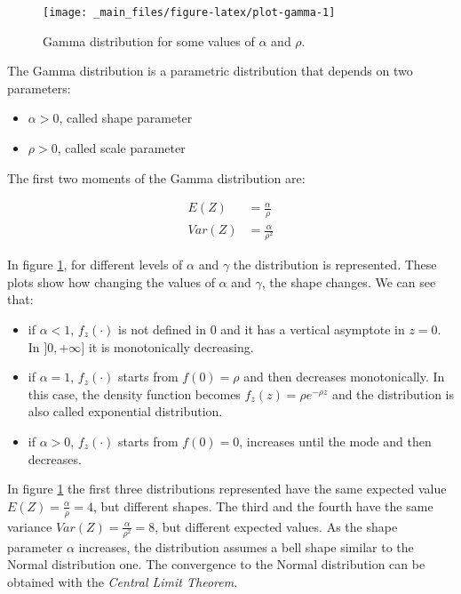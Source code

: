 \documentclass[a4paper, nobind]{templates/ociamthesis}
\providecommand{\tightlist}{%
  \setlength{\itemsep}{0pt}\setlength{\parskip}{0pt}}
\theoremstyle{definition}
\theoremstyle{definition}
\theoremstyle{definition}
\theoremstyle{remark}
\begin{document}
\begin{figure}[hbtp]

{\centering \texttt{[image: \_main\_files/figure-latex/plot-gamma-1]} 

}

\caption{Gamma distribution for some values of $\alpha$ and $\rho$.}\label{fig:plot-gamma}
\end{figure}

The Gamma distribution is a parametric distribution that depends on two parameters:

\begin{itemize}
\tightlist
\item
  \(\alpha > 0\), called shape parameter
\item
  \(\rho > 0\), called scale parameter
\end{itemize}

The first two moments of the Gamma distribution are:

\begin{align*}
E(Z)   & = \frac{\alpha}{\rho} \\
Var(Z) & = \frac{\alpha}{\rho^2}
\end{align*}

In figure \ref{fig:plot-gamma}, for different levels of \(\alpha\) and \(\gamma\) the distribution is represented. These plots show how changing the values of \(\alpha\) and \(\gamma\), the shape changes. We can see that:

\begin{itemize}
\tightlist
\item
  if \(\alpha < 1\), \(f_z(\cdot)\) is not defined in \(0\) and it has a vertical asymptote in \(z = 0\). In \(]0, +\infty]\) it is monotonically decreasing.
\item
  if \(\alpha = 1\), \(f_z(\cdot)\) starts from \(f(0) = \rho\) and then decreases monotonically. In this case, the density function becomes \(f_z(z) = \rho e^{-\rho z}\) and the distribution is also called exponential distribution.
\item
  if \(\alpha > 0\), \(f_z(\cdot)\) starts from \(f(0) = 0\), increases until the mode and then decreases.
\end{itemize}

In figure \ref{fig:plot-gamma} the first three distributions represented have the same expected value \(E(Z)=\frac{\alpha}{\rho} = 4\), but different shapes. The third and the fourth have the same variance \(Var(Z) = \frac{\alpha}{\rho^2} = 8\), but different expected values. As the shape parameter \(\alpha\) increases, the distribution assumes a bell shape similar to the Normal distribution one. The convergence to the Normal distribution can be obtained with the \emph{Central Limit Theorem}.
\end{document}
